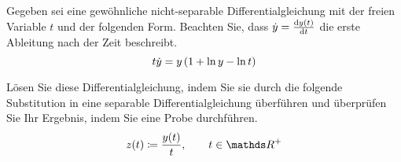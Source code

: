 \begin{atiTask}[
	title = Ähnlichkeitsdifferentialgleichung,
	language = Deutsch
]
	Gegeben sei eine gewöhnliche nicht-separable Differentialgleichung mit der freien Variable $t$ und der folgenden Form.
	Beachten Sie, dass $\dot{y}=\frac{\mathrm{d} y(t)}{\mathrm{d} t}$ die erste Ableitung nach der Zeit beschreibt.
	\[
		t\dot{y} = y\left( 1+\ln y - \ln t \right)
	\]

	Lösen Sie diese Differentialgleichung, indem Sie sie durch die folgende Substitution in eine separable Differentialgleichung überführen und überprüfen Sie Ihr Ergebnis, indem Sie eine Probe durchführen.
	\[
		z(t)\define\frac{y(t)}{t}\separate t\in\setR^+
	\]
\end{atiTask}